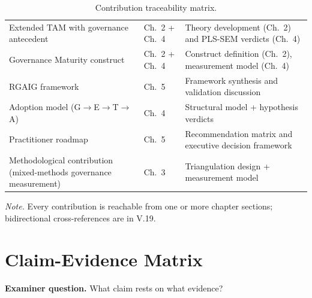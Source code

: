 {\tablestripes\tablefontsize
{}
\begin{xltabular}{\textwidth}{@{} >{\raggedright\arraybackslash}p{4.5cm} p{2.0cm} L @{}}
\caption[Contribution traceability matrix]{Contribution traceability matrix.}\label{tab:dist_contribution_traceability} \\
\toprule
{} &  &  \\
\midrule
\endfirsthead
\endhead
\bottomrule
\endlastfoot
Extended TAM with governance antecedent & Ch.~2 + Ch.~4 & Theory development (Ch.~2) and PLS-SEM verdicts (Ch.~4) \\
\addlinespace
Governance Maturity construct & Ch.~2 + Ch.~4 & Construct definition (Ch.~2), measurement model (Ch.~4) \\
\addlinespace
RGAIG framework & Ch.~5 & Framework synthesis and validation discussion \\
\addlinespace
Adoption model (G$\rightarrow$E$\rightarrow$T$\rightarrow$A) & Ch.~4 & Structural model + hypothesis verdicts \\
\addlinespace
Practitioner roadmap & Ch.~5 & Recommendation matrix and executive decision framework \\
\addlinespace
Methodological contribution (mixed-methods governance measurement) & Ch.~3 & Triangulation design + measurement model \\
\end{xltabular}}

\vspace{0.3em}\noindent\textit{Note.} Every contribution is reachable from one or more chapter sections; bidirectional cross-references are in V.19.


\section{Claim-Evidence Matrix}
\label{app:distinction_claim_evidence}

\noindent\textbf{Examiner question.} What claim rests on what evidence?


